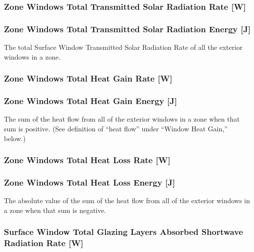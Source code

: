 \subsubsection{Zone Windows Total Transmitted Solar Radiation Rate {[}W{]}}\label{zone-windows-total-transmitted-solar-radiation-rate-w}

\subsubsection{Zone Windows Total Transmitted Solar Radiation Energy {[}J{]}}\label{zone-windows-total-transmitted-solar-radiation-energy-j}

The total Surface Window Transmitted Solar Radiation Rate of all the exterior windows in a zone.

\subsubsection{Zone Windows Total Heat Gain Rate {[}W{]}}\label{zone-windows-total-heat-gain-rate-w}

\subsubsection{Zone Windows Total Heat Gain Energy {[}J{]}}\label{zone-windows-total-heat-gain-energy-j}

The sum of the heat flow from all of the exterior windows in a zone when that sum is positive. (See definition of ``heat flow'' under ``Window Heat Gain,'' below.)

\subsubsection{Zone Windows Total Heat Loss Rate {[}W{]}}\label{zone-windows-total-heat-loss-rate-w}

\subsubsection{Zone Windows Total Heat Loss Energy {[}J{]}}\label{zone-windows-total-heat-loss-energy-j}

The absolute value of the sum of the heat flow from all of the exterior windows in a zone when that sum is negative.

\subsubsection{Surface Window Total Glazing Layers Absorbed Shortwave Radiation Rate {[}W{]}}\label{surface-window-total-glazing-layers-absorbed-shortwave-radiation-rate-w}

